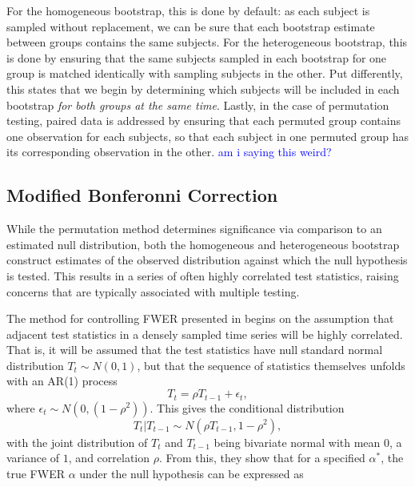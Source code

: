\documentclass{article}
\providecommand{\cn}[1]{\textcolor{blue}{#1}}
\begin{document}
For the homogeneous bootstrap, this is done by default: as each subject is sampled without replacement, we can be sure that each bootstrap estimate between groups contains the same subjects. For the heterogeneous bootstrap, this is done by ensuring that the same subjects sampled in each bootstrap for one group is matched identically with sampling subjects in the other. Put differently, this states that we begin by determining which subjects will be included in each bootstrap \textit{for both groups at the same time}. Lastly, in the case of permutation testing, paired data is addressed by ensuring that each permuted group contains one observation for each subjects, so that each subject in one permuted group has its corresponding observation in the other. \cn{am i saying this weird?}

\subsection{Modified Bonferonni Correction}

While the permutation method determines significance via comparison to an estimated null distribution, both the homogeneous and heterogeneous bootstrap construct estimates of the observed distribution against which the null hypothesis is tested. This results in a series of often highly correlated test statistics, raising concerns that are typically associated with multiple testing. 

The method for controlling FWER presented in \citet{oleson2017detecting} begins on the assumption that adjacent test statistics in a densely sampled time series will be highly correlated. That is, it will be assumed that the test statistics have null standard normal distribution $T_t \sim N(0,1)$, but that the sequence of statistics themselves unfolds with an AR(1) process
\begin{equation}
T_t = \rho  T_{t-1} + \epsilon_t,
\end{equation}
where $\epsilon_t \sim N(0, (1 - \rho^2))$. This gives the conditional distribution
\begin{equation}
T_t | T_{t-1} \sim N(\rho T_{t-1}, 1 - \rho^2),
\end{equation}
with the joint distribution of $T_t$ and $T_{t-1}$ being bivariate normal with mean $0$, a variance of $1$, and correlation $\rho$. From this, they show that for a specified $\alpha^*$, the true FWER $\alpha$ under the null hypothesis can be expressed as 
\end{document}

